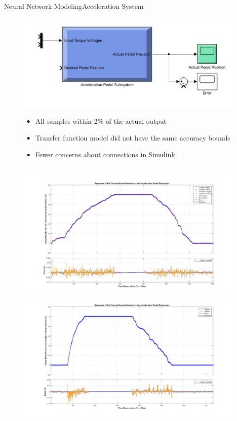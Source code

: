 \documentclass{beamer}
\begin{document}
\begin{frame}{Neural Network Modeling}{Acceleration System}
	\begin{block}{}
  		\begin{figure}[H]
  			\centering \includegraphics[width=.45\linewidth , height=.37\textheight]{figs/img/accelerationSimulinkBlock.jpg}\quad%
			\centering \begin{minipage}[b][0.4\textheight][c]{.45\linewidth}  \begin{itemize}
			\item All samples within 2\% of the actual output
			\item Transfer function model did not have the same accuracy bounds
			\item Fewer concerns about connections in Simulink
			\end{itemize} \end{minipage}\\[1em]
			\centering \includegraphics[width=.45\linewidth , height=.37\textheight]{figs/img/accelNeuralNetworkTrainedOutput.jpg}\quad%
			\centering \includegraphics[width=.45\linewidth , height=.37\textheight]{figs/img/accelNeuralNetworkTrainedOutput2.jpg}
  		\end{figure}
	\end{block}
\end{frame}
\end{document}
